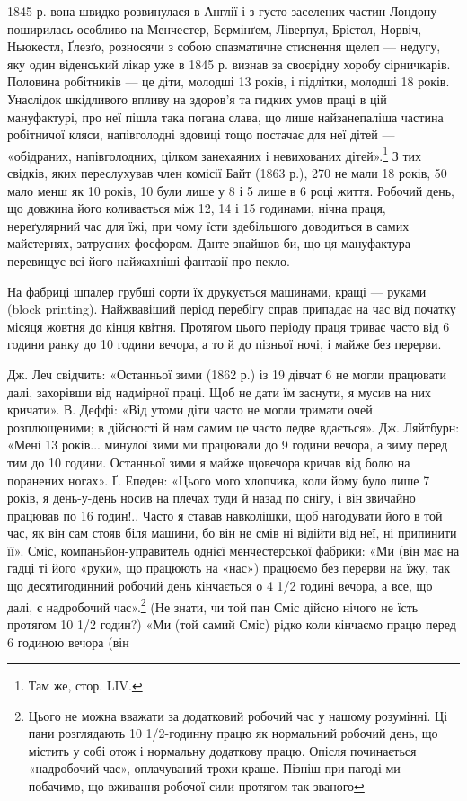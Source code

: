 \parcont{}  %
1845 р. вона швидко розвинулася в Англії і з густо заселених
частин Лондону поширилась особливо на Менчестер, Бермінґем,
Ліверпул, Брістол, Норвіч, Ньюкестл, Ґлезґо, розносячи з
собою спазматичне стиснення щелеп — недугу, яку один віденський
лікар уже в 1845 р. визнав за своєрідну хоробу сірничкарів.
Половина робітників — це діти, молодші 13 років, і
підлітки, молодші 18 років. Унаслідок шкідливого впливу на
здоров’я та гидких умов праці в цій мануфактурі, про неї пішла
така погана слава, що лише найзанепаліша частина робітничої
кляси, напівголодні вдовиці тощо постачає для неї дітей — «обідраних,
напівголодних, цілком занехаяних і невихованих дітей».\footnote{
Там же, стор. LIV.
}
З тих свідків, яких переслухував член комісії Байт (1863 р.),
270 не мали 18 років, 50 мало менш як 10 років, 10 були лише
у 8 і 5 лише в 6 році життя. Робочий день, що довжина його коливається
між 12, 14 і 15 годинами, нічна праця, нереґулярний
час для їжі, при чому їсти здебільшого доводиться в самих майстернях,
затруєних фосфором. Данте знайшов би, що ця мануфактура
перевищує всі його найжахніші фантазії про пекло.

На фабриці шпалер грубші сорти їх друкується машинами,
кращі — руками (block printing). Найжвавіший період перебігу
справ припадає на час від початку місяця жовтня до кінця
квітня. Протягом цього періоду праця триває часто від 6 години
ранку до 10 години вечора, а то й до пізньої ночі, і майже без
перерви.

Дж. Леч свідчить: «Останньої зими (1862 р.) із 19 дівчат 6
не могли працювати далі, захорівши від надмірної праці. Щоб не
дати їм заснути, я мусив на них кричати». В. Деффі: «Від утоми
діти часто не могли тримати очей розплющеними; в дійсності й
нам самим це часто ледве вдається». Дж. Ляйтбурн: «Мені
13 років... минулої зими ми працювали до 9 години вечора, а
зиму перед тим до 10 години. Останньої зими я майже щовечора
кричав від болю на поранених ногах». Ґ. Епеден: «Цього мого
хлопчика, коли йому було лише 7 років, я день-у-день носив
на плечах туди й назад по снігу, і він звичайно працював по
16 годин!.. Часто я ставав навколішки, щоб нагодувати його в той
час, як він сам стояв біля машини, бо він не смів ні відійти від
неї, ні припинити її». Сміс, компаньйон-управитель однієї
менчестерської фабрики: «Ми (він має на гадці ті його «руки»,
що працюють на «нас») працюємо без перерви на їжу, так що
десятигодинний робочий день кінчається о 4 1/2  годині вечора, а
все, що далі, є надробочий час».\footnote{
Цього не можна вважати за додатковий робочий час у нашому розумінні.
Ці пани розглядають 10 1/2-годинну працю як нормальний
робочий день, що містить у собі отож і нормальну додаткову працю. Опісля
починається «надробочий час», оплачуваний трохи краще. Пізніш при
пагоді ми побачимо, що вживання робочої сили протягом так званого
} (Не знати, чи той пан Сміс
дійсно нічого не їсть протягом  10 1/2 годин?) «Ми (той самий
Сміс) рідко коли кінчаємо працю перед 6 годиною вечора (він
\parbreak{}  %
